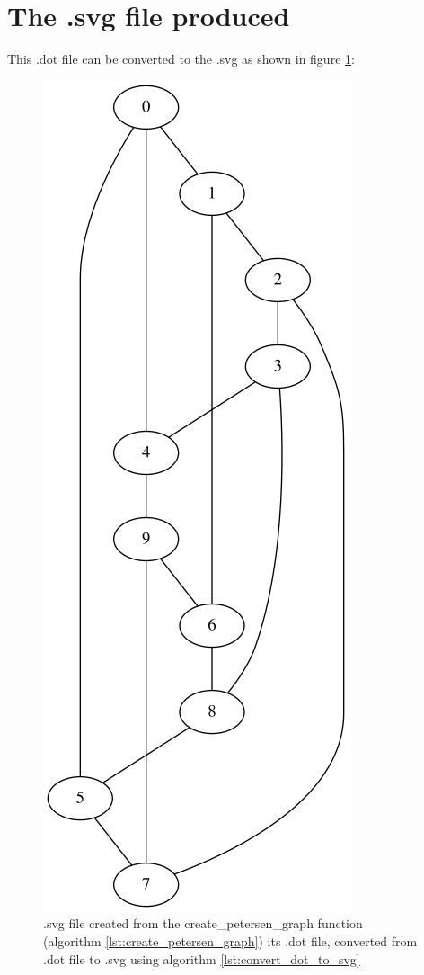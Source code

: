 \section{The .svg file produced}
\label{subsec:create_petersen.svg}

This .dot file can be converted to the .svg as shown in figure 
\ref{fig:create_petersen_graph.svg}:

\begin{figure}[!htbp]
  \includegraphics[]{create_petersen_graph.png}
  \caption{
    .svg file created from the create\_petersen\_graph function 
    (algorithm \ref{lst:create_petersen_graph}) its .dot file, 
    converted from .dot file to .svg using algorithm 
    \ref{lst:convert_dot_to_svg}
  }
  \label{fig:create_petersen_graph.svg}
\end{figure}

